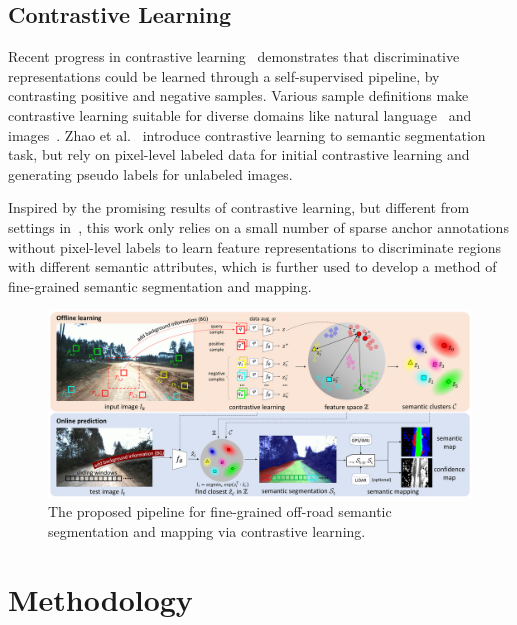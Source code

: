 \documentclass[letterpaper, 10 pt, conference]{ieeeconf}  %
\begin{document}
	\subsection{Contrastive Learning}
	Recent progress in contrastive learning~\cite{oord2018CPC}\cite{chen2020simple}\cite{he2020momentum} demonstrates that discriminative representations could be learned through a self-supervised pipeline, by contrasting positive and negative samples. Various sample definitions make contrastive learning suitable for diverse domains like natural language~\cite{oord2018CPC} and images~\cite{tian2019contrastive}. 
	Zhao et al.~\cite{zhao2020contrastive} introduce contrastive learning to semantic segmentation task, but rely on pixel-level labeled data for initial contrastive learning and generating pseudo labels for unlabeled images.
	
	Inspired by the promising results of contrastive learning, but different from settings in~\cite{zhao2020contrastive}, this work only relies on a small number of sparse anchor annotations without pixel-level labels to learn feature representations to discriminate regions with different semantic attributes, which is further used to develop a method of fine-grained semantic segmentation and mapping.
	
	\begin{figure}[]
		\centering
		\includegraphics[width=\textwidth]{pipeline.pdf}
		\caption{The proposed pipeline for fine-grained off-road semantic segmentation and mapping via contrastive learning.}
		\label{fig:pipeline}
		\vspace{-2mm}
	\end{figure}
	
	\section{Methodology} \label{methodology}
	
\end{document}
